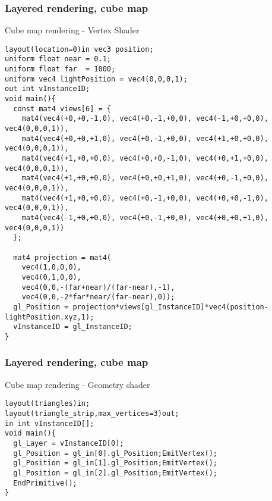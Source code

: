 \begin{frame}[fragile]
\frametitle{Layered rendering, cube map}
Cube map rendering - Vertex Shader
{\tiny
\begin{verbatim}
layout(location=0)in vec3 position;
uniform float near = 0.1;
uniform float far  = 1000;
uniform vec4 lightPosition = vec4(0,0,0,1);
out int vInstanceID;
void main(){
  const mat4 views[6] = {
    mat4(vec4(+0,+0,-1,0), vec4(+0,-1,+0,0), vec4(-1,+0,+0,0), vec4(0,0,0,1)),
    mat4(vec4(+0,+0,+1,0), vec4(+0,-1,+0,0), vec4(+1,+0,+0,0), vec4(0,0,0,1)),
    mat4(vec4(+1,+0,+0,0), vec4(+0,+0,-1,0), vec4(+0,+1,+0,0), vec4(0,0,0,1)),
    mat4(vec4(+1,+0,+0,0), vec4(+0,+0,+1,0), vec4(+0,-1,+0,0), vec4(0,0,0,1)),
    mat4(vec4(+1,+0,+0,0), vec4(+0,-1,+0,0), vec4(+0,+0,-1,0), vec4(0,0,0,1)),
    mat4(vec4(-1,+0,+0,0), vec4(+0,-1,+0,0), vec4(+0,+0,+1,0), vec4(0,0,0,1))
  };

  mat4 projection = mat4(
    vec4(1,0,0,0),
    vec4(0,1,0,0),
    vec4(0,0,-(far+near)/(far-near),-1),
    vec4(0,0,-2*far*near/(far-near),0));
  gl_Position = projection*views[gl_InstanceID]*vec4(position-lightPosition.xyz,1);
  vInstanceID = gl_InstanceID;
}
\end{verbatim}
}
\end{frame}


\begin{frame}[fragile]
\frametitle{Layered rendering, cube map}
Cube map rendering - Geometry shader
{\tiny
\begin{verbatim}
layout(triangles)in;
layout(triangle_strip,max_vertices=3)out;
in int vInstanceID[];
void main(){
  gl_Layer = vInstanceID[0];
  gl_Position = gl_in[0].gl_Position;EmitVertex();
  gl_Position = gl_in[1].gl_Position;EmitVertex();
  gl_Position = gl_in[2].gl_Position;EmitVertex();
  EndPrimitive();
}
\end{verbatim}
}
\end{frame}


